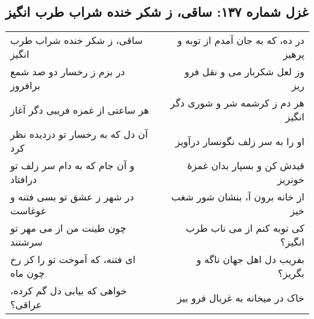 \begin{center}
\section*{غزل شماره ۱۳۷: ساقی، ز شکر خنده شراب طرب انگیز}
\label{sec:137}
\begin{longtable}{l p{0.5cm} r}
ساقی، ز شکر خنده شراب طرب انگیز
&&
در ده، که به جان آمدم از توبه و پرهیز
\\
در بزم ز رخسار دو صد شمع برافروز
&&
وز لعل شکربار می و نقل فرو ریز
\\
هر ساعتی از غمزه فریبی دگر آغاز
&&
هر دم ز کرشمه شر و شوری دگر انگیز
\\
آن دل که به رخسار تو دزدیده نظر کرد
&&
او را به سر زلف نگونسار درآویز
\\
و آن جام که به دام سر زلف تو درافتاد
&&
قیدش کن و بسپار بدان غمزهٔ خونریز
\\
در شهر ز عشق تو بسی فتنه و غوغاست
&&
از خانه برون آ، بنشان شور شغب خیز
\\
چون طینت من از می مهر تو سرشتند
&&
کی توبه کنم از می ناب طرب انگیز؟
\\
ای فتنه، که آموخت تو را کز رخ چون ماه
&&
بفریب دل اهل جهان ناگه و بگریز؟
\\
خواهی که بیابی دل گم کرده، عراقی؟
&&
خاک در میخانه به غربال فرو بیز
\\
\end{longtable}
\end{center}
